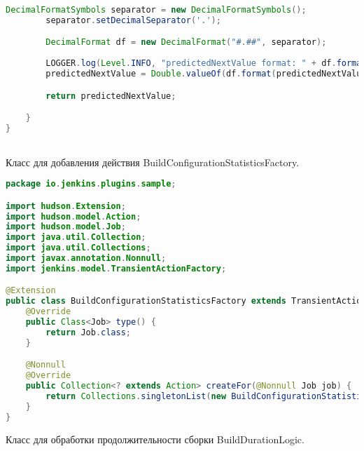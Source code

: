\begin{lstlisting}[language=Java]
        DecimalFormatSymbols separator = new DecimalFormatSymbols();
        separator.setDecimalSeparator('.');

        DecimalFormat df = new DecimalFormat("#.##", separator);
        
        LOGGER.log(Level.INFO, "predictedNextValue format: " + df.format(predictedNextValue));
        predictedNextValue = Double.valueOf(df.format(predictedNextValue));

        return predictedNextValue;

    }
}



\end{lstlisting}

Класс для добавления действия BuildConfigurationStatisticsFactory.

\begin{lstlisting}[language=Java]
package io.jenkins.plugins.sample;

import hudson.Extension;
import hudson.model.Action;
import hudson.model.Job;
import java.util.Collection;
import java.util.Collections;
import javax.annotation.Nonnull;
import jenkins.model.TransientActionFactory;

@Extension
public class BuildConfigurationStatisticsFactory extends TransientActionFactory<Job> {
    @Override
    public Class<Job> type() {
        return Job.class;
    }

    @Nonnull
    @Override
    public Collection<? extends Action> createFor(@Nonnull Job job) {
        return Collections.singletonList(new BuildConfigurationStatisticsAction(job));
    }
}

\end{lstlisting}

Класс для обработки продолжительности сборки BuildDurationLogic.

